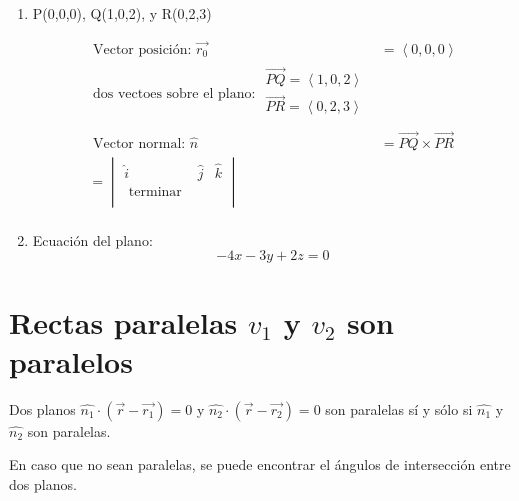 \begin{enumerate}
    
    \item P(0,0,0), Q(1,0,2), y R(0,2,3)
        \begin{center}
            \begin{align*}
                \text{  Vector posición: } \vec{r_0} & = \left\langle 0,0,0 \right\rangle \\ 
                  \text{ dos  vectoes sobre el plano:  } \begin{matrix}
                     \vec{PQ} = \left\langle 1,0,2 \right\rangle \\ 
                     \vec{PR} = \left\langle 0,2,3 \right\rangle  \\ 
                 \end{matrix} \\ 
                \text{  Vector normal:  } \hat{n} & = \overrightarrow{PQ} \times  \overrightarrow{PR} \\ 
                  = \begin{vmatrix}
                     \hat{i} & \hat{j} & \hat{k} \\
                      \text{  terminar  } \\
                 \end{vmatrix} \\
            \end{align*}
        \end{center}
    
    \item Ecuación del plano:
    \[
      -4x-3y+2z=0
    \]
\end{enumerate}

 \section{Rectas paralelas $v_1$ y $v_2$ son paralelos}
Dos planos $\hat{n_1} \cdot (\vec{r}- \vec{r_1})= 0$ y $\hat{n_2} \cdot ( \vec{r}- \vec{r_2}) = 0$ son paralelas sí y sólo si $\hat{n_1}$ y $\hat{n_2}$ son paralelas.

 En caso que no sean paralelas, se puede encontrar el ángulos de intersección entre dos planos.

























